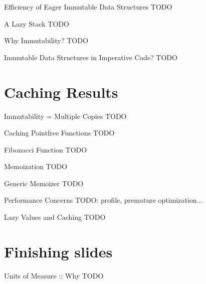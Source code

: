 \documentclass{beamer}
\begin{document}
\begin{frame}{Efficiency of Eager Immutable Data Structures}
  TODO
\end{frame}

\begin{frame}{A Lazy Stack}
  TODO
\end{frame}

\begin{frame}{Why Immutability?}
  TODO
\end{frame}

\begin{frame}{Immutable Data Structures in Imperative Code?}
  TODO
\end{frame}

\section{Caching Results}
\frame{\tableofcontents[currentsection]}

\begin{frame}{Immutability = Multiple Copies}
  TODO
\end{frame}

\begin{frame}{Caching Pointfree Functions}
  TODO
\end{frame}

\begin{frame}{Fibonacci Function}
  TODO
\end{frame}

\begin{frame}{Memoization}
  TODO
\end{frame}

\begin{frame}{Generic Memoizer}
  TODO
\end{frame}

\begin{frame}{Performance Concerns}
  TODO: profile, premature optimization...
\end{frame}

\begin{frame}{Lazy Values and Caching}
  TODO
\end{frame}

\section{Finishing slides}
\frame{\tableofcontents[currentsection]}

\begin{frame}{Units of Measure :: Why}
  TODO
\end{frame}
\end{document}
